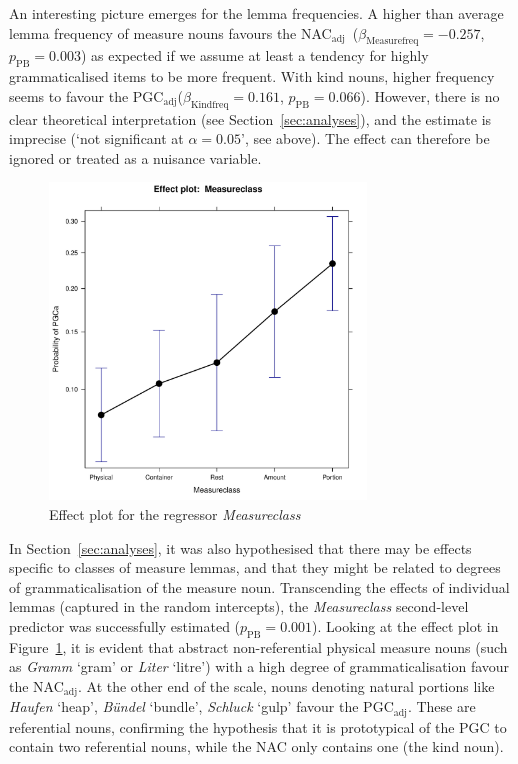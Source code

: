 \documentclass[USenglish]{article}
\newcommand{\Sub}[1]{\ensuremath{\mathrm{_{#1}}}}
\newcommand{\mpPB}{\ensuremath{p_{\text{PB}}}}
\newcommand{\NACa}{NAC\Sub{adj}}
\newcommand{\PGCa}{PGC\Sub{adj}}
\begin{document}
An interesting picture emerges for the lemma frequencies.
A higher than average lemma frequency of measure nouns favours the \NACa\ ($\beta_{\text{Measurefreq}}=-0.257$, $\mpPB=0.003$) as expected if we assume at least a tendency for highly grammaticalised items to be more frequent.
With kind nouns, higher frequency seems to favour the \PGCa ($\beta_{\text{Kindfreq}}=0.161$, $\mpPB=0.066$).
However, there is no clear theoretical interpretation (see Section~\ref{sec:analyses}), and the estimate is imprecise (`not significant at $\alpha=0.05$', see above).
The effect can therefore be ignored or treated as a nuisance variable.



\begin{figure}[h!]
  \centering
  \includegraphics[width=0.75\textwidth]{../R/output/corpus_Measureclass}
  \caption{Effect plot for the regressor \textit{Measureclass}}
  \label{fig:eff:measureattraction}
\end{figure}

In Section~\ref{sec:analyses}, it was also hypothesised that there may be effects specific to classes of measure lemmas, and that they might be related to degrees of grammaticalisation of the measure noun.
Transcending the effects of individual lemmas (captured in the random intercepts), the \textit{Measureclass} second-level predictor was successfully estimated ($\mpPB=0.001$).
Looking at the effect plot in Figure~\ref{fig:eff:measureattraction}, it is evident that abstract non-referential physical measure nouns (such as \textit{Gramm} `gram' or \textit{Liter} `litre') with a high degree of grammaticalisation favour the \NACa.
At the other end of the scale, nouns denoting natural portions like \textit{Haufen} `heap', \textit{Bündel} `bundle', \textit{Schluck} `gulp' favour the \PGCa.
These are referential nouns, confirming the hypothesis that it is prototypical of the PGC to contain two referential nouns, while the NAC only contains one (the kind noun).
\end{document}

